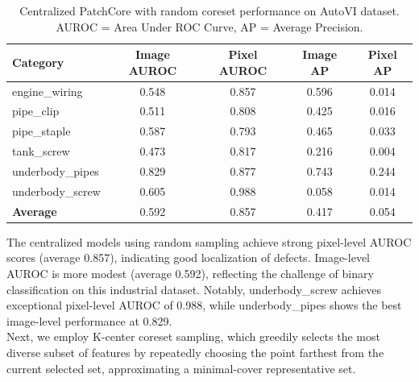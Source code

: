 \documentclass{article}
\begin{document}
\begin{table}[htbp]
    \centering
    \begin{tabular}{l c c c c}
        \hline
        \textbf{Category} & \textbf{Image AUROC} & \textbf{Pixel AUROC} & \textbf{Image AP} & \textbf{Pixel AP} \\
        \hline
        engine\_wiring     & 0.548 & 0.857 & 0.596 & 0.014 \\
        pipe\_clip         & 0.511 & 0.808 & 0.425 & 0.016 \\
        pipe\_staple       & 0.587 & 0.793 & 0.465 & 0.033 \\
        tank\_screw        & 0.473 & 0.817 & 0.216 & 0.004 \\
        underbody\_pipes   & 0.829 & 0.877 & 0.743 & 0.244 \\
        underbody\_screw   & 0.605 & 0.988 & 0.058 & 0.014 \\
        \hline
        \textbf{Average}   & 0.592 & 0.857 & 0.417 & 0.054 \\
        \hline
    \end{tabular}
    \caption{Centralized PatchCore with random coreset performance on AutoVI dataset. AUROC = Area Under ROC Curve, AP = Average Precision.}
    \label{tab:centralized_results_random}
\end{table}

The centralized models using random sampling achieve strong pixel-level AUROC scores (average 0.857), indicating good localization of defects. Image-level AUROC is more modest (average 0.592), reflecting the challenge of binary classification on this industrial dataset. Notably, underbody\_screw achieves exceptional pixel-level AUROC of 0.988, while underbody\_pipes shows the best image-level performance at 0.829.
\\

Next, we employ K-center coreset sampling, which greedily selects the most diverse subset of features by repeatedly choosing the point farthest from the current selected set, approximating a minimal-cover representative set.
\end{document}
